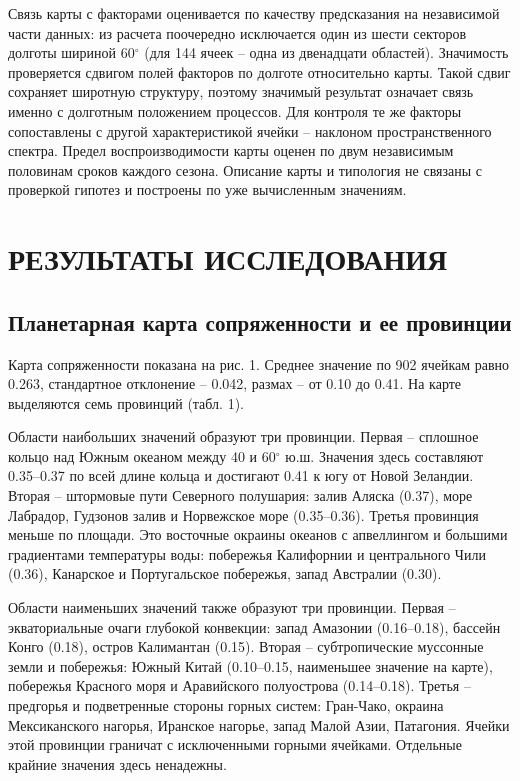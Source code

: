 \documentclass[12pt,a4paper]{article}
\begin{document}
Связь карты с факторами оценивается по качеству предсказания на независимой части данных: из расчета поочередно исключается один из шести секторов долготы шириной 60$^\circ$ (для 144 ячеек -- одна из двенадцати областей). Значимость проверяется сдвигом полей факторов по долготе относительно карты. Такой сдвиг сохраняет широтную структуру, поэтому значимый результат означает связь именно с долготным положением процессов. Для контроля те же факторы сопоставлены с другой характеристикой ячейки -- наклоном пространственного спектра. Предел воспроизводимости карты оценен по двум независимым половинам сроков каждого сезона. Описание карты и типология не связаны с проверкой гипотез и построены по уже вычисленным значениям.

\section{РЕЗУЛЬТАТЫ ИССЛЕДОВАНИЯ}

\subsection{Планетарная карта сопряженности и ее провинции}

Карта сопряженности показана на рис. 1. Среднее значение по 902 ячейкам равно 0.263, стандартное отклонение -- 0.042, размах -- от 0.10 до 0.41. На карте выделяются семь провинций (табл. 1).

Области наибольших значений образуют три провинции. Первая -- сплошное кольцо над Южным океаном между 40 и 60$^\circ$ ю.ш. Значения здесь составляют 0.35--0.37 по всей длине кольца и достигают 0.41 к югу от Новой Зеландии. Вторая -- штормовые пути Северного полушария: залив Аляска (0.37), море Лабрадор, Гудзонов залив и Норвежское море (0.35--0.36). Третья провинция меньше по площади. Это восточные окраины океанов с апвеллингом и большими градиентами температуры воды: побережья Калифорнии и центрального Чили (0.36), Канарское и Португальское побережья, запад Австралии (0.30).

Области наименьших значений также образуют три провинции. Первая -- экваториальные очаги глубокой конвекции: запад Амазонии (0.16--0.18), бассейн Конго (0.18), остров Калимантан (0.15). Вторая -- субтропические муссонные земли и побережья: Южный Китай (0.10--0.15, наименьшее значение на карте), побережья Красного моря и Аравийского полуострова (0.14--0.18). Третья -- предгорья и подветренные стороны горных систем: Гран-Чако, окраина Мексиканского нагорья, Иранское нагорье, запад Малой Азии, Патагония. Ячейки этой провинции граничат с исключенными горными ячейками. Отдельные крайние значения здесь ненадежны.
\end{document}
